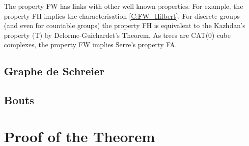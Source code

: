 \documentclass[a4paper]{article}
\theoremstyle{remark}%
\begin{document}
The property FW has links with other well known properties. For example, the property FH implies the characterisation \ref{C:FW_Hilbert}. For discrete groups (and even for countable groups) the property FH is equivalent to the Kazhdan's property (T) by Delorme-Guichardet's Theorem. As trees are CAT(0) cube complexes, the property FW implies Serre's property FA. %
%
%
\subsection{Graphe de Schreier}
%
%
%
\subsection{Bouts}
%
%
\section{Proof of the Theorem}






\enddocument
\end{document}
